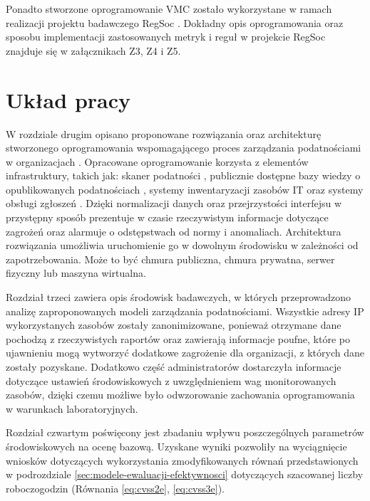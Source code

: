 \bigbreak
Ponadto stworzone oprogramowanie VMC zostało wykorzystane w ramach realizacji projektu badawczego RegSoc \cite{regsoc}. Dokładny opis oprogramowania oraz sposobu implementacji zastosowanych metryk i reguł w projekcie RegSoc znajduje się w załącznikach Z3, Z4 i Z5.


\section{Układ pracy}
W rozdziale drugim opisano proponowane rozwiązania oraz architekturę stworzonego oprogramowania  wspomagającego proces zarządzania podatnościami w organizacjach \cite{rochford2008t, Gartner-2020}. Opracowane oprogramowanie korzysta z elementów infrastruktury, takich jak: skaner podatności \cite{beale2004nessus, rahalkar2019openvas}, publicznie dostępne bazy wiedzy o opublikowanych podatnościach \cite{booth2013national, exploitexploits}, systemy inwentaryzacji zasobów IT \cite{baron2010configuration} oraz systemy obsługi zgłoszeń \cite{thehive}. Dzięki normalizacji danych oraz przejrzystości interfejsu w przystępny sposób prezentuje w czasie rzeczywistym informacje dotyczące zagrożeń oraz alarmuje o odstępstwach od normy i anomaliach. Architektura rozwiązania umożliwia uruchomienie go w dowolnym środowisku w zależności od zapotrzebowania. Może to być chmura publiczna, chmura prywatna, serwer fizyczny lub maszyna wirtualna.

\bigbreak
Rozdział trzeci zawiera opis środowisk badawczych, w których przeprowadzono analizę zaproponowanych modeli zarządzania podatnościami. Wszystkie adresy IP wykorzystanych zasobów zostały zanonimizowane, ponieważ otrzymane dane pochodzą z rzeczywistych raportów oraz zawierają informacje poufne, które po ujawnieniu mogą wytworzyć dodatkowe zagrożenie dla organizacji, z których dane zostały pozyskane. Dodatkowo część administratorów dostarczyła informacje dotyczące ustawień środowiskowych z uwzględnieniem wag monitorowanych zasobów, dzięki czemu możliwe było odwzorowanie zachowania oprogramowania w warunkach laboratoryjnych.

\bigbreak
Rozdział czwartym poświęcony jest zbadaniu wpływu poszczególnych parametrów środowiskowych na ocenę bazową.  Uzyskane wyniki pozwoliły na wyciągnięcie wniosków dotyczących wykorzystania zmodyfikowanych równań przedstawionych w podrozdziale \ref{sec:modele-ewaluacji-efektywnosci} dotyczących szacowanej liczby roboczogodzin (Równania \ref{eq:cvss2e}, \ref{eq:cvss3e}).

